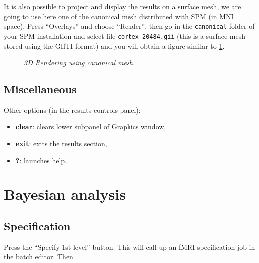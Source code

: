 It is also possible to project and display the results on a surface mesh, we are going to use here one of the canonical mesh distributed with SPM (in MNI space). Press ``Overlays'' and choose ``Render'', then go in the \texttt{canonical} folder of your SPM installation and select file \texttt{cortex\_20484.gii} (this is a surface mesh stored using the GIfTI format) and you will obtain a figure similar to \ref{aud_render2}.

\begin{figure}
\begin{center}
\caption{\emph{3D Rendering using canonical mesh.} \label{aud_render2}}
\end{center}
\end{figure}

\subsection{Miscellaneous}

Other options (in the results controls panel):

\begin{itemize}
\item \textbf{clear}: clears lower subpanel of Graphics window,
\item \textbf{exit}: exits the results section,
\item \textbf{?}: launches help.
\end{itemize}

\section{Bayesian analysis}

\subsection{Specification}

Press the ``Specify 1st-level'' button. This will call up an fMRI specification job in the batch editor. Then

